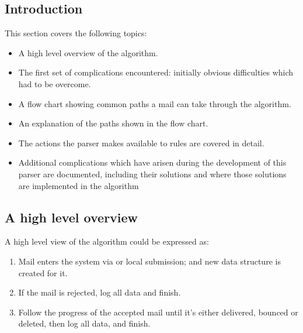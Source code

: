 \documentclass[a4paper,12pt,draft]{article}
\begin{document}
\subsection{Introduction}

This section covers the following topics:

\begin{itemize}

    \item A high level overview of the algorithm.

    \item The first set of complications encountered: initially obvious
        difficulties which had to be overcome.

    \item A flow chart showing common paths a mail can take through the
        algorithm.

    \item An explanation of the paths shown in the flow chart.

    \item The actions the parser makes available to rules are covered in
        detail.

    \item Additional complications which have arisen during the development
        of this parser are documented, including their solutions and where
        those solutions are implemented in the algorithm

\end{itemize}

\subsection{A high level overview}

A high level view of the algorithm could be expressed as:

\begin{enumerate}

    \item Mail enters the system via \SMTP{} or local submission; and new
        data structure is created for it.

    \item If the mail is rejected, log all data and finish.

    \item Follow the progress of the accepted mail until it's either
        delivered, bounced or deleted, then log all data, and finish.

\end{enumerate}
\end{document}
